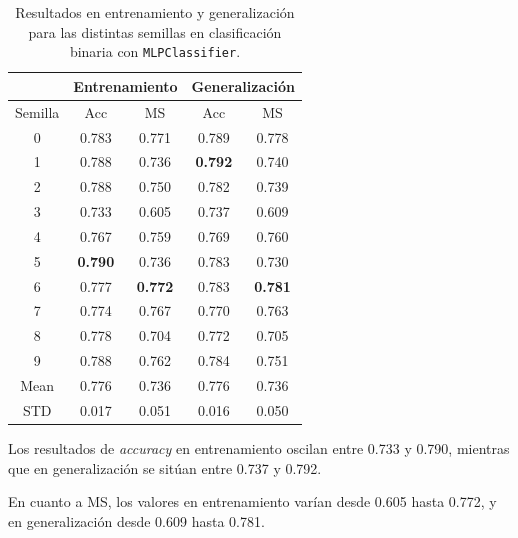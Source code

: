 \begin{table}[H]
	\centering
	\begin{tabular}{ |c|c|c|c|c| }
		\hline
		\rowcolor{LightCyan}
		 & \multicolumn{2}{c|}{Entrenamiento} & \multicolumn{2}{c|}{Generalización} \\
		\hline
		\rowcolor{LightCyan}
		 Semilla & Acc & MS & Acc & MS \\
		\hline
		0    & 0.783          & 0.771          & 0.789          & 0.778          \\
		1    & 0.788          & 0.736          & \textbf{0.792} & 0.740          \\
		2    & 0.788          & 0.750          & 0.782          & 0.739          \\
		3    & 0.733          & 0.605          & 0.737          & 0.609          \\
		4    & 0.767          & 0.759          & 0.769          & 0.760          \\
		5    & \textbf{0.790} & 0.736          & 0.783          & 0.730          \\
		6    & 0.777          & \textbf{0.772} & 0.783          & \textbf{0.781} \\
		7    & 0.774          & 0.767          & 0.770          & 0.763          \\
		8    & 0.778          & 0.704          & 0.772          & 0.705          \\
		9    & 0.788          & 0.762          & 0.784          & 0.751          \\
		Mean & 0.776          & 0.736          & 0.776          & 0.736          \\
		STD  & 0.017          & 0.051          & 0.016          & 0.050          \\
		\hline
	\end{tabular}
	\caption{Resultados en entrenamiento y generalización para las distintas semillas en clasificación binaria con \texttt{MLPClassifier}.}
	\label{tabla:mlp_bin}
\end{table}

Los resultados de \textit{accuracy} en entrenamiento oscilan entre 0.733 y 0.790, mientras que en generalización se sitúan entre 0.737 y 0.792.

\vspace{1em}

En cuanto a MS, los valores en entrenamiento varían desde 0.605 hasta 0.772, y en generalización desde 0.609 hasta 0.781.

\vspace{1em}

